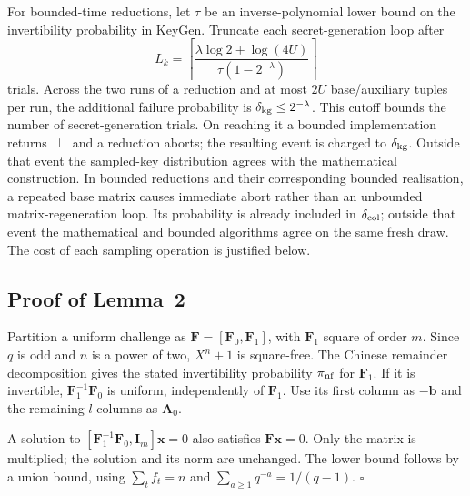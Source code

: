 \documentclass[lettersize,journal]{IEEEtran}
\newenvironment{proof}{{\noindent\it Proof:} }{\hfill $\square$\par}
\begin{document}
For bounded-time reductions, let $\tau$ be an inverse-polynomial lower bound on the invertibility probability in KeyGen. Truncate each secret-generation loop after
\[
L_k=\left\lceil\frac{\lambda\log2+\log(4U)}{\tau(1-2^{-\lambda})}\right\rceil
\]
trials. Across the two runs of a reduction and at most $2U$ base/auxiliary tuples per run, the additional failure probability is $\delta_{\rm kg}\le2^{-\lambda}$. This cutoff bounds the number of secret-generation trials. On reaching it a bounded implementation returns $\perp$ and a reduction aborts; the resulting event is charged to $\delta_{\rm kg}$. Outside that event the sampled-key distribution agrees with the mathematical construction. In bounded reductions and their corresponding bounded realisation, a repeated base matrix causes immediate abort rather than an unbounded matrix-regeneration loop. Its probability is already included in $\delta_{\rm col}$; outside that event the mathematical and bounded algorithms agree on the same fresh draw. The cost of each sampling operation is justified below.

\subsection{Proof of Lemma~2}
\label{app:proof-normal-msis}
\begin{proof}
	Partition a uniform challenge as $\mathbf F=[\mathbf F_0,\mathbf F_1]$, with $\mathbf F_1$ square of order $m$. Since $q$ is odd and $n$ is a power of two, $X^n+1$ is square-free. The Chinese remainder decomposition gives the stated invertibility probability $\pi_{\rm nf}$ for $\mathbf F_1$. If it is invertible, $\mathbf F_1^{-1}\mathbf F_0$ is uniform, independently of $\mathbf F_1$. Use its first column as $-\mathbf b$ and the remaining $l$ columns as $\mathbf A_0$. 
	
	A solution to $[\mathbf F_1^{-1}\mathbf F_0,\mathbf I_m]\mathbf x=0$ also satisfies $\mathbf F\mathbf x=0$. Only the matrix is multiplied; the solution and its norm are unchanged. The lower bound follows by a union bound, using $\sum_t f_t=n$ and $\sum_{a\ge1}q^{-a}=1/(q-1)$.
\end{proof}
\end{document}
